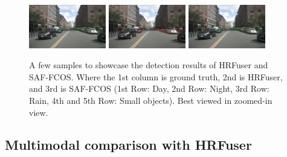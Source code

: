 \documentclass[report.tex]{subfiles}
\begin{document}
\begin{figure}[h!]
        \includegraphics[width=0.3\textwidth]{images/results/saf_vs_hrfuser/samples/s2_small/n008-2018-08-01-15-34-25-0400__CAM_FRONT__1533152641412404_gt.png}\hfill
        \includegraphics[width=0.3\textwidth]{images/results/saf_vs_hrfuser/samples/s2_small/n008-2018-08-01-15-34-25-0400__CAM_FRONT__1533152641412404_former.jpg}\hfill
        \includegraphics[width=0.3\textwidth]{images/results/saf_vs_hrfuser/samples/s2_small/n008-2018-08-01-15-34-25-0400__CAM_FRONT__1533152641412404.png}
      
        \caption{A few samples to showcase the detection results of HRFuser and SAF-FCOS. Where the 1st column is ground truth, 2nd is HRFuser, and 3rd is SAF-FCOS (1st Row: Day, 2nd Row: Night, 3rd Row: Rain, 4th and 5th Row: Small objects). Best viewed in zoomed-in view.}
        \label{fig:saf_vs_hrfuser}
      \end{figure}
    

    \subsection{Multimodal comparison with HRFuser}

\end{document}
